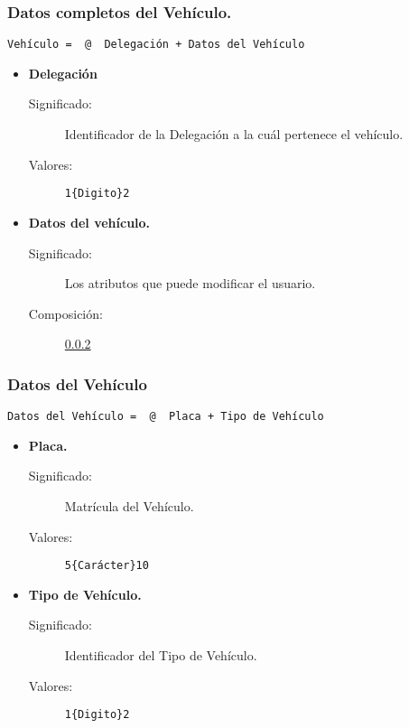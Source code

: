 \subsubsection{Datos completos del Vehículo.}
\begin{lstlisting}
Vehículo =  @  Delegación + Datos del Vehículo
\end{lstlisting}
	\begin{itemize}
		\item \textbf{Delegación}
			\begin{description}
				\item [Significado:] Identificador de la Delegación a la cuál pertenece el vehículo.
				\item [Valores:]{\begin{lstlisting}
1{Digito}2\end{lstlisting}}
			\end{description}
		\item \textbf{Datos del vehículo.}
			\begin{description}
				\item [Significado:] Los atributos que puede modificar el usuario.
				\item [Composición:] \ref{Datos_Vehiculo}
			\end{description}
	\end{itemize}

\subsubsection{Datos del Vehículo}\label{Datos_Vehiculo}
\begin{lstlisting}
Datos del Vehículo =  @  Placa + Tipo de Vehículo
\end{lstlisting}
	\begin{itemize}
		\item \textbf{Placa.}
			\begin{description}
				\item [Significado:] Matrícula del Vehículo.
				\item [Valores:]{\begin{lstlisting}
5{Carácter}10\end{lstlisting}}
			\end{description}
		\item \textbf{Tipo de Vehículo.}
			\begin{description}
				\item [Significado:] Identificador del Tipo de Vehículo.
				\item [Valores:]{\begin{lstlisting}
1{Digito}2\end{lstlisting}}
			\end{description}
	\end{itemize}